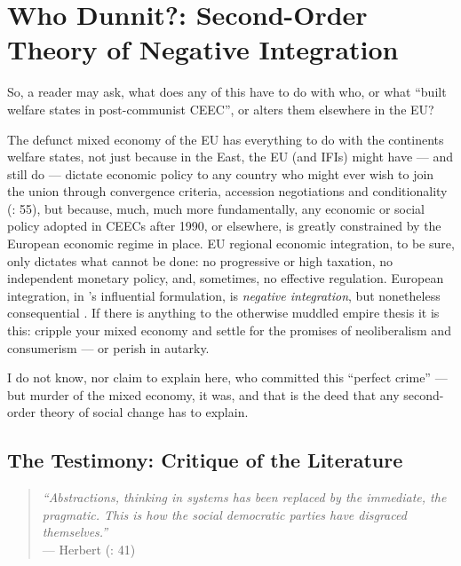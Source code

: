 \documentclass[11pt,a4paper,oneside,openright]{article}
\begin{document}
\newpage

\section{Who Dunnit?: Second-Order Theory of Negative Integration} \label{sec:who_dunnit}

So, a reader may ask, what does any of this have to do with who, or what  ``built welfare states in post-communist \gls{CEEC}'', or alters them elsewhere in the \gls{EU}? 

The defunct mixed economy of the \gls{EU} has everything to do with the continents welfare states, not just because in the East, the \gls{EU} (and \glspl{IFI}) might have --- and still do --- dictate economic policy to any country who might ever wish to join the union through convergence criteria, accession negotiations and conditionality (\citealt{Bonker2006}: 55), but because, much, much more fundamentally, any economic or social policy adopted in \glspl{CEEC} after 1990, or elsewhere, is greatly constrained by the European economic regime in place. \gls{EU} regional economic integration, to be sure, only dictates what cannot be done: no progressive or high taxation, no independent monetary policy, and, sometimes, no effective regulation. %
European integration, in \citeauthor{Scharpf1997}'s influential formulation, is \emph{negative integration}, but nonetheless consequential \citep{Scharpf1997}. If there is anything to the otherwise muddled empire thesis \citep{BeckGrande-2007-aa} it is this: cripple your mixed economy and settle for the promises of neoliberalism and consumerism --- or perish in autarky.

I do not know, nor claim to explain here, who committed this ``perfect crime'' \citep{Galbraith2002a} --- but murder of the mixed economy, it was, and that is the deed that any second-order theory of social change has to explain.

\subsection[Literature]{The Testimony: Critique of the Literature} \label{sec:Literature}

\begin{quote}
	\emph{``Abstractions, thinking in systems has been replaced by the immediate, the pragmatic. This is how the social democratic parties have disgraced themselves.''}\\
	--- Herbert \citeauthor{Schui2009} (\citeyear{Schui2009}: 41)
\end{quote}
\end{document}

